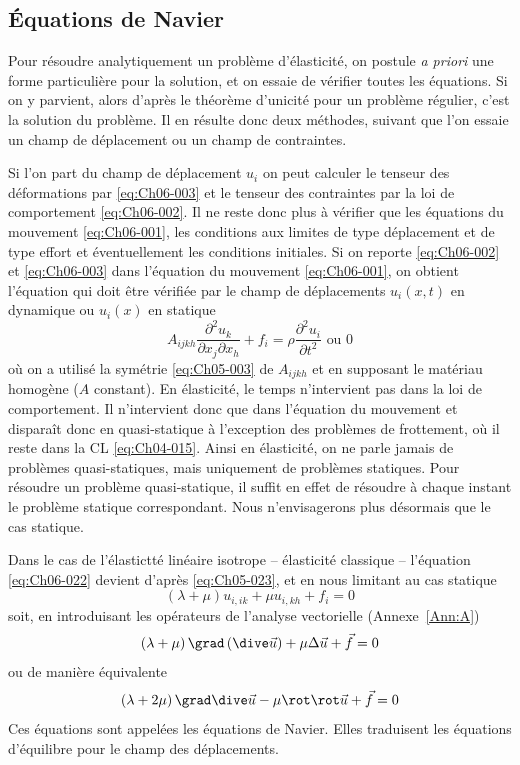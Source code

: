 \subsection{Équations de Navier} \label{ssec:Ch06-1.3}
Pour résoudre analytiquement un problème d'élasticité, on postule \textit{a priori} une forme particulière pour la solution, et on essaie de vérifier toutes les équations.
Si on y parvient, alors d'après le théorème d'unicité pour un problème régulier, c'est la solution du problème.
Il en résulte donc deux méthodes, suivant que l'on essaie un champ de déplacement ou un champ de contraintes.

Si l'on part du champ de déplacement $u_i$ on peut calculer le tenseur des déformations par \eqref{eq:Ch06-003} et le tenseur des contraintes par la loi de comportement \eqref{eq:Ch06-002}.
Il ne reste donc plus à vérifier que les équations du mouvement \eqref{eq:Ch06-001}, les conditions aux limites de type déplacement et de type effort et éventuellement les conditions initiales.
Si on reporte \eqref{eq:Ch06-002} et \eqref{eq:Ch06-003} dans l'équation du mouvement \eqref{eq:Ch06-001}, on obtient l'équation qui doit être vérifiée par le champ de déplacements $u_i\left( x,t \right)$ en dynamique ou $u_i(x)$ en statique
\begin{equation}
    A_{ijkh} \frac{\partial^2 u_k}{\partial x_j \partial x_h} + f_i = \rho \frac{\partial^2 u_i}{\partial t^2} \text{ ou } 0
    \label{eq:Ch06-022}
\end{equation}
où on a utilisé la symétrie \eqref{eq:Ch05-003} de $A_{ijkh}$ et en supposant le matériau homogène ($A$ constant).
En élasticité, le temps n'intervient pas dans la loi de comportement.
Il n'intervient donc que dans l'équation du mouvement et disparaît donc en quasi-statique à l'exception des problèmes de frottement, où il reste dans la CL \eqref{eq:Ch04-015}.
Ainsi en élasticité, on ne parle jamais de problèmes quasi-statiques, mais uniquement de problèmes statiques.
Pour résoudre un problème quasi-statique, il suffit en effet de résoudre à chaque instant le problème statique correspondant.
Nous n'envisagerons plus désormais que le cas statique.

Dans le cas de l'élastictté linéaire isotrope -- élasticité classique -- l'équation \eqref{eq:Ch06-022} devient d'après \eqref{eq:Ch05-023}, et en nous limitant au cas statique
\begin{equation}
    \left( \lambda + \mu \right) u_{i,ik} + \mu u_{i,kh} + f_i = 0
    \label{eq:Ch06-023}
\end{equation}
soit, en introduisant les opérateurs de l'analyse vectorielle (Annexe~\ref{Ann:A})
\begin{equation}
    \left( \lambda + \mu \right) \grad \left( \dive \vec{u} \right) + \mu \Delta \vec{u} + \vec{f} = 0
    \label{eq:Ch06-024}
\end{equation}
ou de manière équivalente
\begin{equation}
    \left( \lambda + 2\mu \right) \grad \dive \vec{u} - \mu \rot \rot \vec{u} + \vec{f} = 0
    \label{eq:Ch06-025}
\end{equation}
Ces équations sont appelées les équations de Navier.
Elles traduisent les équations d'équilibre pour le champ des déplacements.

